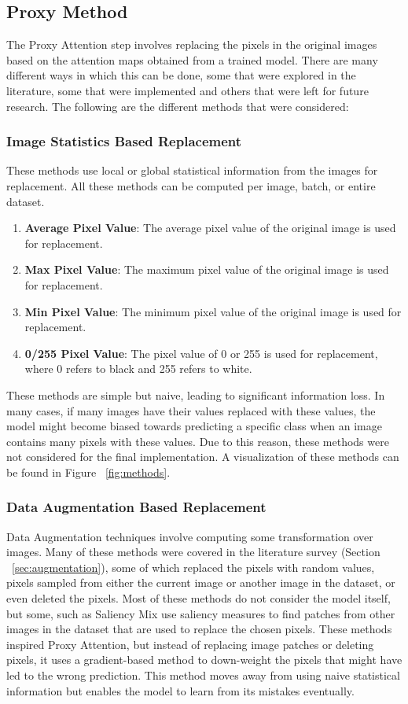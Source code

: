 \subsection{Proxy Method}
The Proxy Attention step involves replacing the pixels in the original images based on the attention maps obtained from a trained model. There are many different ways in which this can be done, some that were explored in the literature, some that were implemented and others that were left for future research. The following are the different methods that were considered:

\subsubsection{Image Statistics Based Replacement}
These methods use local or global statistical information from the images for replacement. All these methods can be computed per image, batch, or entire dataset.

\begin{enumerate}
    \item \textbf{Average Pixel Value}: The average pixel value of the original image is used for replacement.
    \item \textbf{Max Pixel Value}: The maximum pixel value of the original image is used for replacement.
    \item \textbf{Min Pixel Value}: The minimum pixel value of the original image is used for replacement.
    \item \textbf{0/255 Pixel Value}: The pixel value of 0 or 255 is used for replacement, where 0 refers to black and 255 refers to white.
\end{enumerate}
These methods are simple but naive, leading to significant information loss. In many cases, if many images have their values replaced with these values, the model might become biased towards predicting a specific class when an image contains many pixels with these values.
Due to this reason, these methods were not considered for the final implementation. A visualization of these methods can be found in Figure ~\ref{fig:methods}.

\subsubsection{Data Augmentation Based Replacement}
Data Augmentation techniques involve computing some transformation over images. Many of these methods were covered in the literature survey (Section ~\ref{sec:augmentation}), some of which replaced the pixels with random values, pixels sampled from either the current image or another image in the dataset, or even deleted the pixels. Most of these methods do not consider the model itself, but some, such as Saliency Mix \cite{uddinSaliencyMixSaliencyGuided2021} use saliency measures to find patches from other images in the dataset that are used to replace the chosen pixels.
These methods inspired Proxy Attention, but instead of replacing image patches or deleting pixels, it uses a gradient-based method to down-weight the pixels that might have led to the wrong prediction. This method moves away from using naive statistical information but enables the model to learn from its mistakes eventually.

